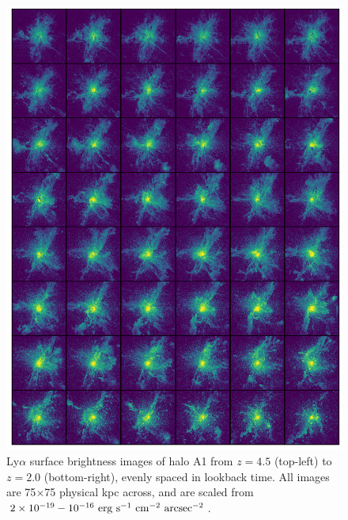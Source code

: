\begin{figure}
    \centering
    \includegraphics[width=\textwidth,keepaspectratio]{figures/rogues_A1.png}
    \caption{
        Ly$\alpha$ surface brightness images of halo A1 from $z=4.5$ (top-left) to $z=2.0$ (bottom-right), evenly spaced in lookback time.
        All images are 75$\times$75 physical kpc across, and are scaled from $2\times 10^{-19}-10^{-16}\ \rm{erg}\ \rm{s}^{-1}\ \rm{cm}^{-2}\ \rm{arcsec}^{-2}$.
    }
  \label{fig:rogues1}
\end{figure}

